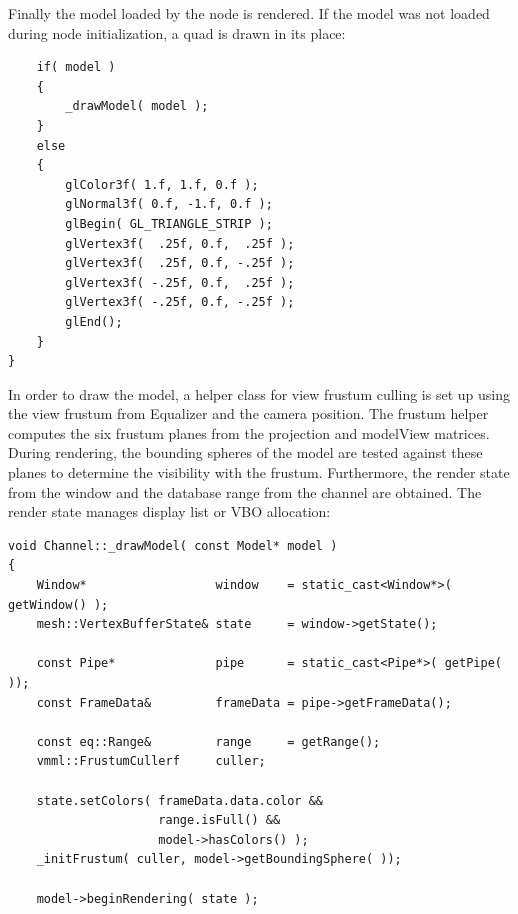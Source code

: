 \documentclass[10pt,a4]{scrartcl}
\begin{document}
Finally the model loaded by the node is rendered. If the model was not
loaded during node initialization, a quad is drawn in its place:

{\footnotesize\begin{lstlisting}
    if( model )
    {
        _drawModel( model );
    }
    else
    {
        glColor3f( 1.f, 1.f, 0.f );
        glNormal3f( 0.f, -1.f, 0.f );
        glBegin( GL_TRIANGLE_STRIP );
        glVertex3f(  .25f, 0.f,  .25f );
        glVertex3f(  .25f, 0.f, -.25f );
        glVertex3f( -.25f, 0.f,  .25f );
        glVertex3f( -.25f, 0.f, -.25f );
        glEnd();
    }
}
\end{lstlisting}}

In order to draw the model, a helper class for view frustum culling is
set up using the view frustum from Equalizer and the camera
position. The frustum helper computes the six frustum planes from the
projection and modelView matrices. During rendering, the bounding
spheres of the model are tested against these planes to determine the
visibility with the frustum. Furthermore, the render state from the
window and the database range from the channel are obtained. The render
state manages display list or VBO allocation:

{\footnotesize\begin{lstlisting}
void Channel::_drawModel( const Model* model )
{
    Window*                  window    = static_cast<Window*>( getWindow() );
    mesh::VertexBufferState& state     = window->getState();

    const Pipe*              pipe      = static_cast<Pipe*>( getPipe( ));
    const FrameData&         frameData = pipe->getFrameData();

    const eq::Range&         range     = getRange();
    vmml::FrustumCullerf     culler;

    state.setColors( frameData.data.color && 
                     range.isFull() && 
                     model->hasColors() );
    _initFrustum( culler, model->getBoundingSphere( ));

    model->beginRendering( state );
        
\end{lstlisting}}
\end{document}
